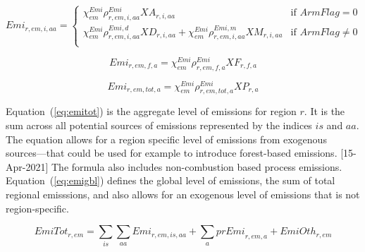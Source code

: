 \documentclass[11pt,letterpaper]{report}
\begin{document}
\begin{equation}
\label{eq:emii}
\mathit{Emi}_{r,\mathit{em},i,\mathit{aa}} = \left\{
\begin{array}{*{20}{l}}
   \displaystyle \chi^{\mathit{Emi}}_{\mathit{em}}
      \rho^{\mathit{Emi}}_{r,\mathit{em},i,\mathit{aa}}
      \mathit{XA}_{r,i,\mathit{aa}}
   & \textrm{if } \mathit{ArmFlag} = 0 \\
   \displaystyle \chi^{\mathit{Emi}}_{\mathit{em}}
      \rho^{\mathit{Emi,d}}_{r,\mathit{em},i,\mathit{aa}}
      \mathit{XD}_{r,i,\mathit{aa}}
   +  \chi^{\mathit{Emi}}_{\mathit{em}}
      \rho^{\mathit{Emi,m}}_{r,\mathit{em},i,\mathit{aa}}
      \mathit{XM}_{r,i,\mathit{aa}}
   & \textrm{if } \mathit{ArmFlag} \ne 0 \\
\end{array}
\right.
\end{equation}

\begin{equation}
\label{eq:emifact}
\mathit{Emi}_{r,\mathit{em},f,\mathit{a}} =
   \chi^{\mathit{Emi}}_{\mathit{em}}
   \rho^{\mathit{Emi}}_{r,\mathit{em},\mathit{f},\mathit{a}}
   \mathit{XF}_{r,f,\mathit{a}}
\end{equation}

\begin{equation}
\label{eq:emixp}
\mathit{Emi}_{r,\mathit{em},\mathit{tot},\mathit{a}} =
   \chi^{\mathit{Emi}}_{\mathit{em}}
   \rho^{\mathit{Emi}}_{r,\mathit{em},\mathit{tot},\mathit{a}}
   \mathit{XP}_{r,\mathit{a}}
\end{equation}

Equation~(\ref{eq:emitot}) is the aggregate level of emissions for region $r$.
It is the sum across all potential sources of emissions represented by the
indices $\mathit{is}$ and $\mathit{aa}$. The equation allows for a region
specific level of emissions from exogenous sources---that could be used for
example to introduce forest-based emissions.
[15-Apr-2021] The formula also includes non-combustion based process
emissions.
Equation~(\ref{eq:emigbl}) defines
the global level of emissions, the sum of total regional emisssions, and also
allows for an exogenous level of emissions that is not region-specific.

\begin{equation}
\label{eq:emitot}
\mathit{EmiTot}_{r,\mathit{em}} =
   \displaystyle \sum_{\mathit{is}} {\sum_{\mathit{aa}} {
      \mathit{Emi}_{r,\mathit{em},\mathit{is},\mathit{aa}}
   }}
   + \sum_a{\mathit{prEmi}_{r,\mathit{em},a}}
   + \mathit{EmiOth}_{r,\mathit{em}}
\end{equation}
\end{document}
